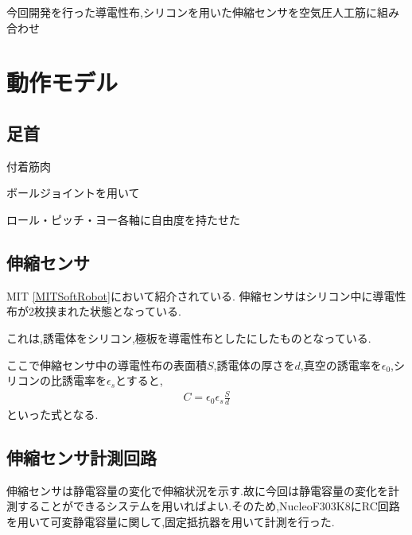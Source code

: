 今回開発を行った導電性布,シリコンを用いた伸縮センサを空気圧人工筋に組み合わせ
\section{動作モデル}
\subsection{足首}
付着筋肉

ボールジョイントを用いて

ロール・ピッチ・ヨー各軸に自由度を持たせた
\subsection{伸縮センサ}
MIT \ref{MITSoftRobot}において紹介されている.
伸縮センサはシリコン中に導電性布が2枚挟まれた状態となっている.

これは,誘電体をシリコン,極板を導電性布としたにしたものとなっている.

ここで伸縮センサ中の導電性布の表面積$S$,誘電体の厚さを$d$,真空の誘電率を$\epsilon{}_0$,シリコンの比誘電率を$\epsilon{}_s$とすると,
\begin{eqnarray}
    C=\epsilon{}_0\epsilon{}_s\frac{S}{d}
\end{eqnarray}
といった式となる.
\subsection{伸縮センサ計測回路}
伸縮センサは静電容量の変化で伸縮状況を示す.故に今回は静電容量の変化を計測することができるシステムを用いればよい.そのため,NucleoF303K8にRC回路を用いて可変静電容量に関して,固定抵抗器を用いて計測を行った.

